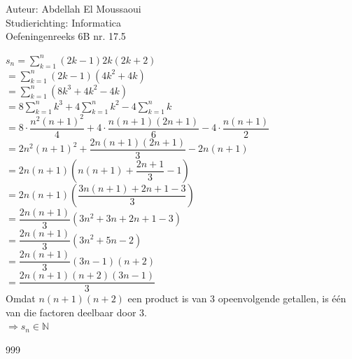 \documentclass[a4paper]{article}
\begin{document}
  
\noindent \large Auteur: Abdellah El Moussaoui \\
\noindent \large Studierichting: Informatica\\
\noindent \large Oefeningenreeks 6B nr. 17.5\\

\medskip

\normalsize

$s_n =\displaystyle\sum_{k=1}^{n}\left(2k-1\right)2k\left(2k+2\right)$\\

$=\displaystyle\sum_{k=1}^{n}\left(2k-1\right)\left(4k^2+4k\right)$\\

$= \displaystyle\sum_{k=1}^{n}\left(8k^3+4k^2-4k\right)$\\

$= 8\displaystyle\sum_{k=1}^{n}k^3+4\displaystyle\sum_{k=1}^{n}k^2-4\displaystyle\sum_{k=1}^{n}k$\\

$= 8\cdot\dfrac{n^2\left(n+1\right)^2}{4}+4\cdot\dfrac{n\left(n+1\right)\left(2n+1\right)}{6}-4\cdot\dfrac{n\left(n+1\right)}{2}$\\


$= 2n^2\left(n+1\right)^2+\dfrac{2n\left(n+1\right)\left(2n+1\right)}{3} - 2n\left(n+1\right)$\\

$= 2n\left(n+1\right) \left(n(n+1)+\dfrac{2n+1}{3}-1\right)$\\


$= 2n\left(n+1\right) \left(\dfrac{3n\left(n+1\right)+2n+1-3}{3}\right)$\\


$ =\dfrac{2n\left(n+1\right)}{3}\left(3n^2+3n+2n+1-3\right)$\\

$= \dfrac{2n\left(n+1\right)}{3}\left(3n^2+5n-2\right)$\\

$= \dfrac{2n\left(n+1\right)}{3}\left(3n-1\right)\left(n+2\right)$\\

$= \dfrac{2n\left(n+1\right)\left(n+2\right)\left(3n-1\right)}{3}$\\

Omdat $n\left(n+1\right)\left(n+2\right)$ een product is van 3 opeenvolgende getallen, is één van die factoren deelbaar door 3.\\

$\Rightarrow s_n\in\mathbb{N}$\\


\begin{thebibliography}{999}
\end{thebibliography}
\end{document}
